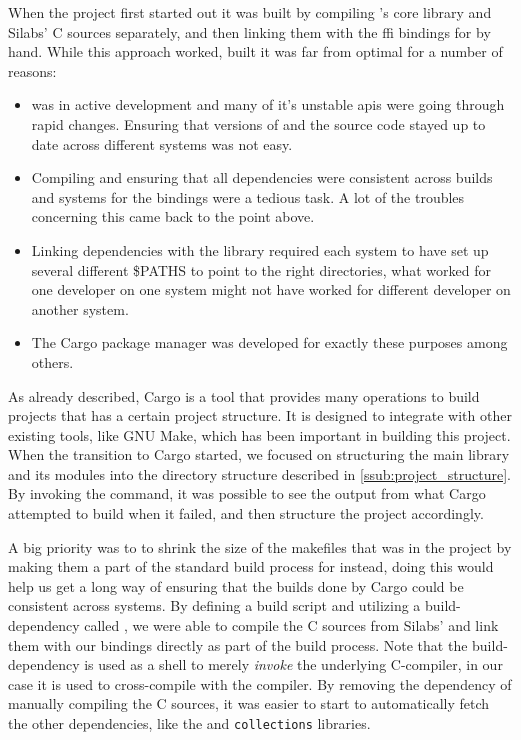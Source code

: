 When the project first started out it was built by compiling {\rust}'s core library and Silabs' {\emlib} C sources separately, and then linking them with the \gls{ffi} bindings for {\emlib} by hand.
While this approach worked, built it was far from optimal for a number of reasons:

\begin{itemize}
    \item {\rust} was in active development and many of it's unstable \glspl{api} were going through rapid changes. Ensuring that versions of {\rustc} and the {\rust} source code stayed up to date across different systems was not easy.
    \item Compiling and ensuring that all dependencies were consistent across builds and systems for the bindings were a tedious task. A lot of the troubles concerning this came back to the point above.
    \item Linking dependencies with the library required each system to have set up several different \$PATHS to point to the right directories, what worked for one developer on one system might not have worked for different developer on another system.
    \item The Cargo package manager was developed for exactly these purposes among others.
\end{itemize}

As already described, Cargo is a tool that provides many operations to build {\rust} projects that has a certain project structure.
It is designed to integrate with other existing tools, like GNU Make, which has been important in  building this project.
When the transition to Cargo started, we focused on structuring the main library and its modules into the directory structure described in \autoref{ssub:project_structure}.
By invoking the  command, it was possible to see the output from what Cargo attempted to build when it failed, and then structure the project accordingly.

A big priority was to to shrink the size of the makefiles that was in the project by making them a part of the standard build process for {\emlib} instead, doing this would help us get a long way of ensuring that the builds done by Cargo could be consistent across systems.
By defining a {\rust} build script and utilizing a {\rust} build-dependency called  \cite{web:cargo_gcc}, we were able to compile the C sources from Silabs' {\emlib} and link them with our bindings directly as part of the build process.
Note that the  build-dependency is used as a shell to merely \emph{invoke} the underlying C-compiler, in our case it is used to cross-compile with the {\armgcc} compiler.
By removing the dependency of manually compiling the C sources, it was easier to start to automatically fetch the other dependencies, like the {\core} and \texttt{collections} libraries.

